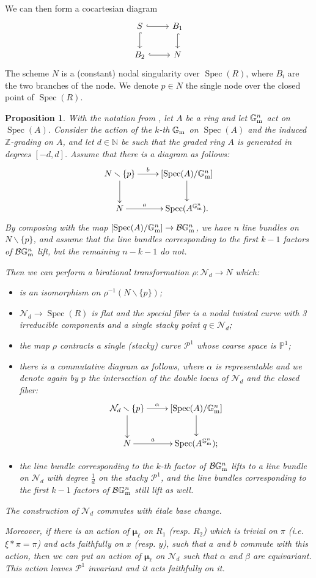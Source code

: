 \documentclass{amsart}
\newcommand{\bG}{\mathbb{G}}
\newcommand{\bP}{\mathbb{P}}
\newcommand{\bZ}{\mathbb{Z}}
\newcommand{\cB}{\mathcal{B}}
\newcommand{\cN}{\mathcal{N}}
\newcommand{\cP}{\mathcal{P}}
\newcommand{\spec}{\operatorname{Spec}}
\newcommand{\Gm}{\bG_{{\rm m}}}
\newcommand{\bmu}{\bm{\mu}}
\newtheorem{Prop}[theorem]{Proposition}
\theoremstyle{definition}
\begin{document}
 We can then form a cocartesian diagram
\[
\begin{tikzcd}
S \ar[r, hookrightarrow] \ar[d, hookrightarrow] & B_1 \ar[d, hookrightarrow] \\
B_2 \ar[r, hookrightarrow] & N
\end{tikzcd}
\]
The scheme $N$ is a (constant) nodal singularity over $\spec(R)$, where $B_i $ are the two branches of the node. We denote $p\in N$ the single node over the closed point of $\spec(R)$.
\begin{Prop}\label{proposition val criterion for the nodes}
With the notation from , let $A$ be a ring and let $\Gm^{n}$ act on $\spec(A)$. Consider the action of the $k$-th $\Gm$ on $\spec(A)$ and the induced $\bZ$-grading on $A$, and let $d\in\mathbb{N}$ be such that the graded ring $A$ is generated in degrees $[-d,d]$. Assume that there is a diagram as follows:
$$\xymatrix{N \smallsetminus \{p\} \ar[r]^-b \ar[d] & [\spec(A)/\Gm^n]\ar[d]\\ N \ar[r]^-{a}  & \spec(A^{\Gm^n}).}$$
By composing with the map $[\spec(A)/\Gm^n]\to \cB\Gm^n$, we have $n$ line bundles on $N\smallsetminus \{p\}$, and assume that the line bundles corresponding to the first $k-1$ factors of $\cB\Gm^n$ lift, but the remaining $n-k-1$ do not.


Then we can perform a birational transformation $\rho:\cN_d\to N$ which:
\begin{itemize}
    \item is an isomorphism on $\rho^{-1}(N\smallsetminus \{p\})$;
    \item $\cN_d\to \spec(R)$ is flat and the special fiber is a nodal twisted curve with 3 irreducible components and a single stacky point $q\in \cN_d$;
    \item the map $\rho$ contracts a single (stacky) curve $\cP^1$ whose coarse space is $\bP^1$;
    \item there is a commutative diagram as follows, where $\alpha$ is representable and we denote again by $p$ the intersection of the double locus of $\cN_d$ and the closed fiber:
    $$\xymatrix{\cN_d\smallsetminus \{p\}\ar[r]^-\alpha \ar[d] & [\spec(A)/\Gm^n]\ar[d]\\ N \ar[r]^-a  & \spec(A^{\Gm^n});}$$
    \item the line bundle corresponding to the $k$-th factor of $\cB\Gm^n$ lifts to a line bundle  on $\cN_d$ with degree $\frac{1}{d}$ on the stacky $\cP^1$, and the line bundles corresponding to the first $k-1$ factors of $\cB\Gm^n$ still lift as well.
\end{itemize} 
The construction of $\cN_d$ commutes with \'etale base change.

Moreover, if there is an action of $\bmu_\ell$ on $R_1$ (resp. $R_2$) which is trivial on $\pi$ (i.e. $\xi*\pi = \pi$) and acts faithfully on $x$ (resp. $y$), such that $a$ and $b$ commute with this action, then we can put an action of $\bmu_\ell$ on $\cN_d$ such that $\alpha$ and $\beta$ are equivariant. This action leaves $\cP^1$ invariant and it acts faithfully on it.
\end{Prop}
\end{document}
